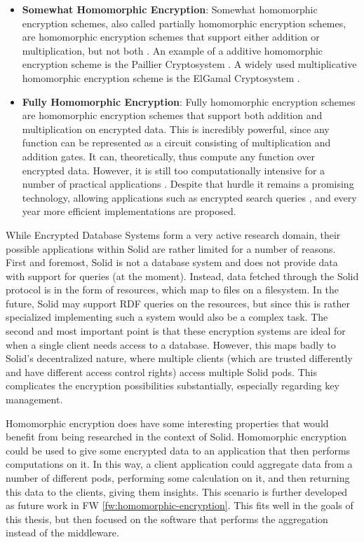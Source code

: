\begin{itemize}
    \item \textbf{Somewhat Homomorphic Encryption}: Somewhat homomorphic encryption schemes, also called partially homomorphic encryption schemes, are homomorphic encryption schemes that support either addition or multiplication, but not both \citep{she}. An example of a additive homomorphic encryption scheme is the Paillier Cryptosystem \citep{paillier}. A widely used multiplicative homomorphic encryption scheme is the ElGamal Cryptosystem \citep{elgamal}.
    \item \textbf{Fully Homomorphic Encryption}: Fully homomorphic encryption schemes are homomorphic encryption schemes that support both addition and multiplication on encrypted data. This is incredibly powerful, since any function can be represented as a circuit consisting of multiplication and addition gates. It can, theoretically, thus compute any function over encrypted data. However, it is still too computationally intensive for a number of practical applications \citep{he-practical, pragmatic-mpc}. Despite that hurdle it remains a promising technology, allowing applications such as encrypted search queries \citep{fhe}, and every year more efficient implementations are proposed.
\end{itemize}

\noindent While Encrypted Database Systems form a very active research domain, their possible applications within Solid are rather limited for a number of reasons. First and foremost, Solid is not a database system and does not provide data with support for queries (at the moment). Instead, data fetched through the Solid protocol is in the form of resources, which map to files on a filesystem. In the future, Solid may support RDF queries on the resources, but since this is rather specialized implementing such a system would also be a complex task. The second and most important point is that these encryption systems are ideal for when a single client needs access to a database. However, this maps badly to Solid's decentralized nature, where multiple clients (which are trusted differently and have different access control rights) access multiple Solid pods. This complicates the encryption possibilities substantially, especially regarding key management. 

Homomorphic encryption does have some interesting properties that would benefit from being researched in the context of Solid. Homomorphic encryption could be used to give some encrypted data to an application that then performs computations on it. In this way, a client application could aggregate data from a number of different pods, performing some calculation on it, and then returning this data to the clients, giving them insights. This scenario is further developed as future work in FW \ref{fw:homomorphic-encryption}. This fits well in the goals of this thesis, but then focused on the software that performs the aggregation instead of the middleware.

